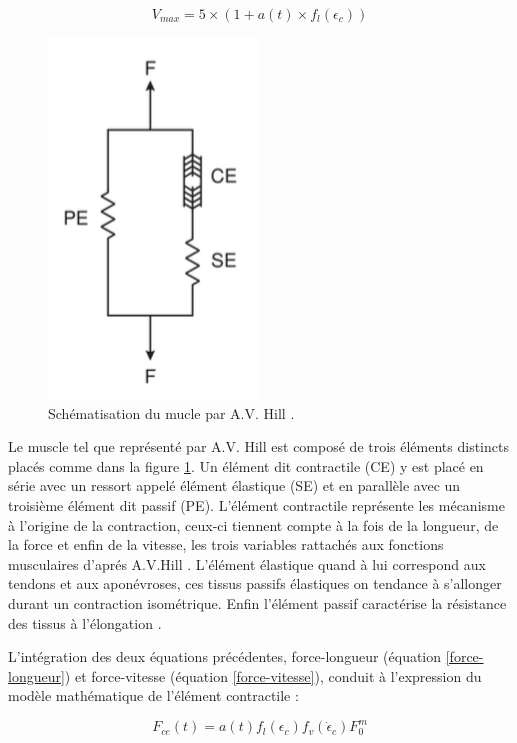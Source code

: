 \begin{equation}
    V_{max} = 5 \times(1+a(t)\times f_l(\epsilon_c))
\end{equation}

\begin{figure}[ht]
    \centering\includegraphics[scale=0.4]{Images/Hill.png}
		\caption{Schématisation du mucle par A.V. Hill \cite{berranen_simulation_2015}.}
		\label{Hill}
\end{figure}
Le muscle tel que représenté par A.V. Hill est composé de trois éléments distincts placés comme dans la figure \ref{Hill}. Un élément dit contractile (CE) y est placé en série avec un ressort appelé élément élastique (SE) et en parallèle avec un troisième élément dit passif (PE). L'élément contractile représente les mécanisme à l'origine de la contraction, ceux-ci tiennent compte à la fois de la longueur, de la force et enfin de la vitesse, les trois variables rattachés aux fonctions musculaires d'aprés A.V.Hill \cite{linden_mechanical_1998}. L'élément élastique quand à lui correspond aux tendons et aux aponévroses, ces tissus passifs élastiques on tendance à s'allonger durant un contraction isométrique. Enfin l'élément passif caractérise la résistance des tissus à l'élongation \cite{berranen_simulation_2015}.

L'intégration des deux équations précédentes, force-longueur (équation \ref{force-longueur}) et force-vitesse (équation \ref{force-vitesse}), conduit à l'expression du modèle mathématique de l'élément contractile \cite{berranen_simulation_2015} : 

\begin{equation}
    F_{ce}(t) = a(t)f_l(\epsilon_c)f_v(\dot\epsilon_c)F_0^m
\end{equation}


